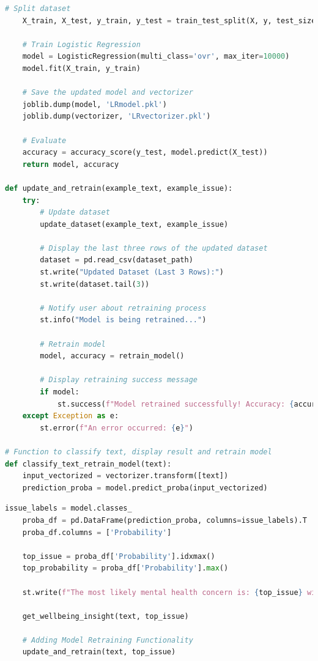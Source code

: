 \begin{tcolorbox}[colback=gray!5!white, colframe=gray!80!black, boxrule=0.5pt, title=Model Retraining Functionality]        
    \begin{lstlisting}[language=Python]
    # Split dataset
    X_train, X_test, y_train, y_test = train_test_split(X, y, test_size=0.2, random_state=42)
    
    # Train Logistic Regression
    model = LogisticRegression(multi_class='ovr', max_iter=10000)
    model.fit(X_train, y_train)
    
    # Save the updated model and vectorizer
    joblib.dump(model, 'LRmodel.pkl')
    joblib.dump(vectorizer, 'LRvectorizer.pkl')
    
    # Evaluate
    accuracy = accuracy_score(y_test, model.predict(X_test))
    return model, accuracy

def update_and_retrain(example_text, example_issue):
    try:
        # Update dataset
        update_dataset(example_text, example_issue)

        # Display the last three rows of the updated dataset
        dataset = pd.read_csv(dataset_path)
        st.write("Updated Dataset (Last 3 Rows):")
        st.write(dataset.tail(3))

        # Notify user about retraining process
        st.info("Model is being retrained...")

        # Retrain model
        model, accuracy = retrain_model()

        # Display retraining success message
        if model:
            st.success(f"Model retrained successfully! Accuracy: {accuracy * 100:.2f}%")
    except Exception as e:
        st.error(f"An error occurred: {e}")

# Function to classify text, display result and retrain model
def classify_text_retrain_model(text):
    input_vectorized = vectorizer.transform([text])
    prediction_proba = model.predict_proba(input_vectorized)
\end{lstlisting}
\end{tcolorbox}
\begin{tcolorbox}[colback=gray!5!white, colframe=gray!80!black, boxrule=0.5pt, title=Model Retraining Functionality]        
    \begin{lstlisting}[language=Python]
    issue_labels = model.classes_
    proba_df = pd.DataFrame(prediction_proba, columns=issue_labels).T
    proba_df.columns = ['Probability']

    top_issue = proba_df['Probability'].idxmax()
    top_probability = proba_df['Probability'].max()

    st.write(f"The most likely mental health concern is: {top_issue} with a probability of {top_probability:.2%}")

    get_wellbeing_insight(text, top_issue)

    # Adding Model Retraining Functionality
    update_and_retrain(text, top_issue)

    \end{lstlisting}
\end{tcolorbox}

